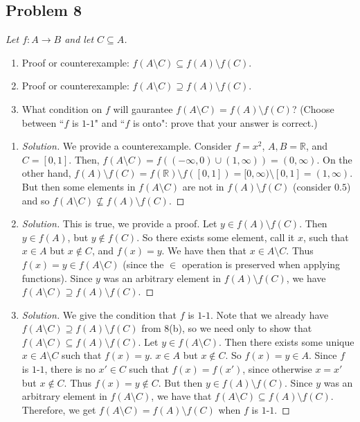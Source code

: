 \documentclass{article}
\newcommand{\R}{{\mathbb R}}
\begin{document}
\subsection*{Problem 8}
{\it Let $f \colon A \to B$ and let $C \subseteq A$.
\begin{enumerate}
	\item Proof or counterexample: $f(A\setminus C) \subseteq f(A) \setminus f(C)$.
	\item Proof or counterexample: $f(A\setminus C) \supseteq f(A) \setminus f(C)$.
	\item What condition on $f$ will gaurantee $f(A\setminus C) = f(A) \setminus f(C)$?
	(Choose between ``$f$ is $1$-$1$" and ``$f$ is onto":
	prove that your answer is correct.)
\end{enumerate}}
\begin{enumerate}
\item \begin{proof}[Solution]\let\qed\relax
We provide a counterexample.
Consider $f = x^2$, $A, B = \R$, and $C = [0,1]$.
Then, $f(A \setminus C) = f((-\infty,0) \cup (1,\infty))
= (0, \infty)$.
On the other hand, $f(A) \setminus f(C) = f(\R) \setminus f([0,1])
= [0,\infty) \setminus [0,1] = (1,\infty)$.
But then some elements in $f(A\setminus C)$ are not in $f(A) \setminus f(C)$
(consider $0.5$) and so $f(A\setminus C) \not\subseteq f(A) \setminus f(C)$.
\end{proof}
\item \begin{proof}[Solution]\let\qed\relax
This is true, we provide a proof.
Let $y \in f(A) \setminus f(C)$.
Then $y \in f(A)$, but $y \not\in f(C)$.
So there exists some element, call it $x$, such that $x \in A$
but $x\not\in C$,
and $f(x) = y$.
We have then that $x \in A \setminus C$.
Thus $f(x) = y \in f(A\setminus C)$
(since the $\in$ operation is preserved when applying functions).
Since $y$ was an arbitrary element in $f(A) \setminus f(C)$,
we have $f(A \setminus C) \supseteq f(A) \setminus f(C)$.
\end{proof}
\item \begin{proof}[Solution]\let\qed\relax
We give the condition that $f$ is $1$-$1$.
Note that we already have $f(A \setminus C) \supseteq f(A) \setminus f(C)$ from 8(b),
so we need only to show that $f(A \setminus C) \subseteq f(A) \setminus f(C)$.
Let $y \in f(A \setminus C)$.
Then there exists some unique $x \in A \setminus C$ such that $f(x) = y$.
$x\in A$ but $x \not\in C$.
So $f(x) = y \in A$.
Since $f$ is $1$-$1$, there is no $x' \in C$ such that $f(x) = f(x')$, since otherwise $x = x'$ but $x \not\in C$.
Thus $f(x) = y \not\in C$.
But then $y \in f(A) \setminus f(C)$.
Since $y$ was an arbitrary element in $f(A\setminus C)$,
we have that $f(A \setminus C) \subseteq f(A) \setminus f(C)$.
Therefore, we get $f(A \setminus C) = f(A) \setminus f(C)$ when $f$ is $1$-$1$.
\end{proof}
\end{enumerate}
\end{document}
